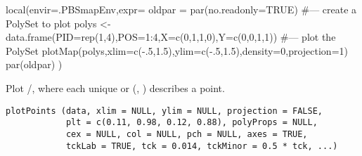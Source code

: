 \documentclass[letterpaper]{book}
\begin{document}
%
\begin{Examples}
\begin{ExampleCode}
local(envir=.PBSmapEnv,expr={
  oldpar = par(no.readonly=TRUE)
  #--- create a PolySet to plot
  polys <- data.frame(PID=rep(1,4),POS=1:4,X=c(0,1,1,0),Y=c(0,0,1,1))
  #--- plot the PolySet
  plotMap(polys,xlim=c(-.5,1.5),ylim=c(-.5,1.5),density=0,projection=1)
  par(oldpar)
})
\end{ExampleCode}
\end{Examples}
%
\begin{Description}\relax
Plot /, where each unique  or
(, ) describes a point.
\end{Description}
%
\begin{Usage}
\begin{verbatim}
plotPoints (data, xlim = NULL, ylim = NULL, projection = FALSE,
            plt = c(0.11, 0.98, 0.12, 0.88), polyProps = NULL,
            cex = NULL, col = NULL, pch = NULL, axes = TRUE,
            tckLab = TRUE, tck = 0.014, tckMinor = 0.5 * tck, ...)
\end{verbatim}
\end{Usage}
%
\end{document}
